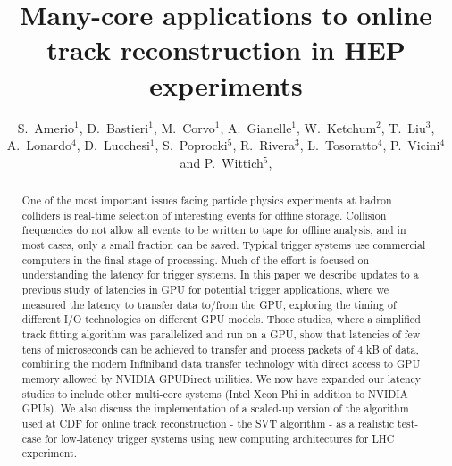 \documentclass[letterpaper]{jpconf}
\begin{document}
\title{Many-core applications to online track reconstruction in HEP experiments}
\author{S.~Amerio$^1$, 
  D.~Bastieri$^1$, 
  M.~Corvo$^1$, 
  A.~Gianelle$^1$, 
  W.~Ketchum$^2$,
  T.~Liu$^3$, 
  A.~Lonardo$^4$, 
  D.~Lucchesi$^1$,
  S.~Poprocki$^5$, 
  R.~Rivera$^3$, 
  L.~Tosoratto$^4$,
  P.~Vicini$^4$
  and 
  P.~Wittich$^5$,
}
\address{$^1$ INFN and University of Padova, Italy}
\address{$^2$ Los Alamos National Laboratory, New Mexico, USA}
\address{$^3$ Fermi National Accelerator Laboratory, Illinois, USA}
\address{$^4$ INFN Roma, Italy}
\address{$^5$ Cornell University, New York, USA}


\begin{abstract}
One of the most important issues facing particle physics experiments at hadron 
colliders is real-time selection of interesting events for offline storage. 
Collision frequencies do not allow all events to be written to tape for 
offline analysis, and in most cases, only a small fraction can be saved. 
Typical trigger systems use commercial computers in the final stage of 
processing. Much of the effort is focused on understanding the latency for 
trigger systems. In this paper we describe updates to a previous study of 
latencies in GPU for potential trigger applications, where we measured the 
latency to transfer data to/from the GPU, exploring the timing of different 
I/O technologies on different GPU models.  Those studies, where a simplified 
track fitting algorithm was parallelized and run on a GPU, show that latencies 
of few tens of microseconds can be achieved to transfer and process packets of 
4 kB of data, combining the modern Infiniband data transfer technology with 
direct access to GPU memory allowed by NVIDIA GPUDirect utilities.  We now 
have expanded our latency studies to include other multi-core systems 
(Intel Xeon Phi in addition to NVIDIA GPUs). We also discuss the implementation 
of a scaled-up version of the algorithm 
used at CDF for online track reconstruction - the SVT algorithm - as a 
realistic test-case for low-latency trigger systems using new computing 
architectures for LHC experiment.

\end{abstract}
\end{document}
